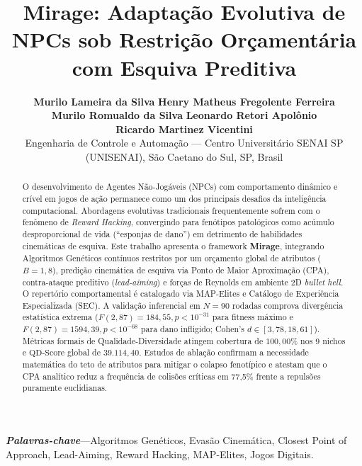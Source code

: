 \documentclass[10pt,conference,twocolumn]{article}
\title{\textbf{Mirage: Adaptação Evolutiva de NPCs sob Restrição Orçamentária com Esquiva Preditiva}}
\author{
  \textbf{Murilo Lameira da Silva} \qquad \textbf{Henry Matheus Fregolente Ferreira} \\
  \textbf{Murilo Romualdo da Silva} \qquad \textbf{Leonardo Retori Apolônio} \\
  \textbf{Ricardo Martinez Vicentini} \\
  \small Engenharia de Controle e Automação --- Centro Universitário SENAI SP (UNISENAI), São Caetano do Sul, SP, Brasil
}
\date{}
\begin{document}
\maketitle

\begin{abstract}
O desenvolvimento de Agentes Não-Jogáveis (NPCs) com comportamento dinâmico e crível em jogos de ação permanece como um dos principais desafios da inteligência computacional. Abordagens evolutivas tradicionais frequentemente sofrem com o fenômeno de \textit{Reward Hacking}, convergindo para fenótipos patológicos como acúmulo desproporcional de vida (``esponjas de dano'') em detrimento de habilidades cinemáticas de esquiva. Este trabalho apresenta o framework \textbf{Mirage}, integrando Algoritmos Genéticos contínuos restritos por um orçamento global de atributos ($B = 1{,}8$), predição cinemática de esquiva via Ponto de Maior Aproximação (CPA), contra-ataque preditivo (\textit{lead-aiming}) e forças de Reynolds em ambiente 2D \textit{bullet hell}. O repertório comportamental é catalogado via MAP-Elites e Catálogo de Experiência Especializada (SEC). A validação inferencial em $N = 90$ rodadas comprova divergência estatística extrema ($F(2, 87) = 184{,}55, p < 10^{-31}$ para fitness máximo e $F(2, 87) = 1594{,}39, p < 10^{-68}$ para dano infligido; Cohen's $d \in [3{,}78, 18{,}61]$). Métricas formais de Qualidade-Diversidade atingem cobertura de $100{,}00\%$ nos 9 nichos e $\text{QD-Score}$ global de $39.114{,}40$. Estudos de ablação confirmam a necessidade matemática do teto de atributos para mitigar o colapso fenotípico e atestam que o CPA analítico reduz a frequência de colisões críticas em 77{,}5\% frente a repulsões puramente euclidianas.
\end{abstract}

\noindent\textbf{\textit{Palavras-chave}}---Algoritmos Genéticos, Evasão Cinemática, Closest Point of Approach, Lead-Aiming, Reward Hacking, MAP-Elites, Jogos Digitais.
\end{document}
